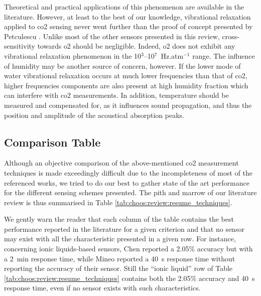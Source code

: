 Theoretical and practical applications of this phenomenon are available in the literature\cite{dain2001, cottet2004, ejakov2003, petculescu2006a, petculescu2006b, jia2018}. However, at least to the best of our knowledge, vibrational relaxation applied to \gls{co2} sensing never went further than the proof of concept presented by Petculescu \etal{}\cite{petculescu2006b}. Unlike most of the other sensors presented in this review, cross-sensitivity towards \gls{o2} should be negligible. Indeed, \gls{o2} does not exhibit any vibrational relaxation phenomenon in the 10$^3$--10$^7$~Hz.atm$^{-1}$ range\cite{ejakov2003}. The influence of humidity may be another source of concern, however. If the lower mode of water vibrational relaxation occurs at much lower frequencies than that of \gls{co2}\cite{zuckerwar1981}, higher frequencies components are also present at high humidity fraction which can interfere with \gls{co2} measurements\cite{ejakov2003}. In addition, temperature should be measured and compensated for, as it influences sound propagation, and thus the position and amplitude of the acoustical absorption peaks\cite{dain2001}.

\subsection{Comparison Table}\label{subsect:choos:review:comp_table}

Although an objective comparison of the above-mentioned \gls{co2} measurement techniques is made exceedingly difficult due to the incompleteness of most of the referenced works, we tried to do our best to gather state of the art performance for the different sensing schemes presented. The pith and marrow of our literature review is thus summarised in Table \ref{tab:choos:review:resume_techniques}.

We gently warn the reader that each column of the table contains the best performance reported in the literature for a given criterion and that no sensor may exist with all the characteristic presented in a given row. For instance, concerning ionic liquids-based sensors, Chen \etal{}\cite{chen2011} reported a 2.05\% accuracy but with a 2~min response time, while Mineo \etal{}\cite{mineo2012} reported a 40~s response time without reporting the accuracy of their sensor. Still the \enquote{ionic liquid} row of Table \ref{tab:choos:review:resume_techniques} contains both the 2.05\% accuracy and 40~s response time, even if no sensor exists with such characteristics.

